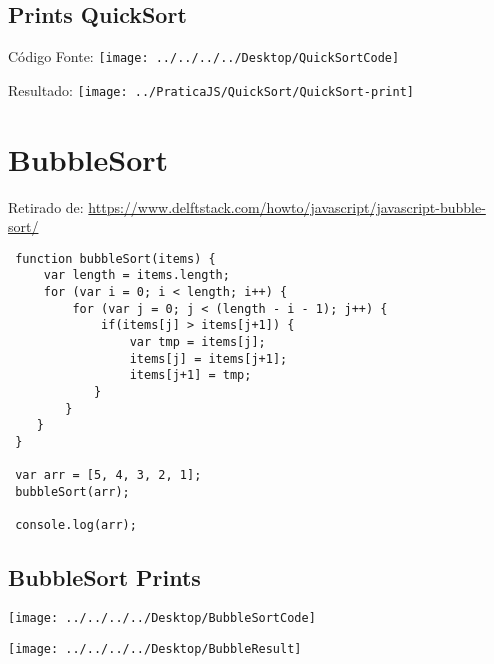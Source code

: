 \subsection{Prints QuickSort}
	Código Fonte:
	\texttt{[image: ../../../../Desktop/QuickSortCode]}
	
	Resultado:
	\texttt{[image: ../PraticaJS/QuickSort/QuickSort-print]}
	
	
 \section{BubbleSort}
 Retirado de: \url{https://www.delftstack.com/howto/javascript/javascript-bubble-sort/}
 \begin{lstlisting}
 function bubbleSort(items) {
	 var length = items.length;  
	 for (var i = 0; i < length; i++) { 
		 for (var j = 0; j < (length - i - 1); j++) { 
			 if(items[j] > items[j+1]) {
				 var tmp = items[j]; 
				 items[j] = items[j+1]; 
				 items[j+1] = tmp; 
 			}
 		}        
 	}
 }
 
 var arr = [5, 4, 3, 2, 1]; 
 bubbleSort(arr);
 
 console.log(arr);
 \end{lstlisting}
 
 \subsection{BubbleSort Prints}

	\texttt{[image: ../../../../Desktop/BubbleSortCode]}


	\texttt{[image: ../../../../Desktop/BubbleResult]}
	
	


	